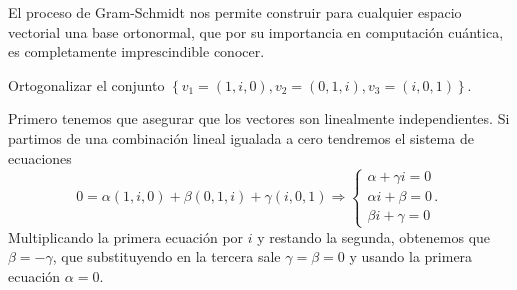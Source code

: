 El proceso de Gram-Schmidt nos permite construir para cualquier espacio vectorial una base ortonormal, que por su importancia en computación cuántica, es completamente imprescindible conocer.

\begin{eje}[Ortogonalización en $\C^3$]
  Ortogonalizar el conjunto $\left\{v_1 = (1, i, 0), v_2 = (0, 1, i), v_3 = (i, 0, 1)\right\}$.

  Primero tenemos que asegurar que los vectores son linealmente independientes.
  Si partimos de una combinación lineal igualada a cero tendremos el sistema de ecuaciones
  \[
    0 = \alpha (1, i, 0) + \beta (0, 1, i) + \gamma (i, 0, 1)\Rightarrow
    \begin{cases}
      \alpha + \gamma i = 0    \\
      \alpha i + \beta = 0 \,. \\
      \beta i + \gamma = 0
    \end{cases}
  \]
  Multiplicando la primera ecuación por $i$ y restando la segunda, obtenemos que $\beta=-\gamma$, que substituyendo en la tercera sale $\gamma=\beta=0$ y usando la primera ecuación $\alpha=0$.


\end{eje}
